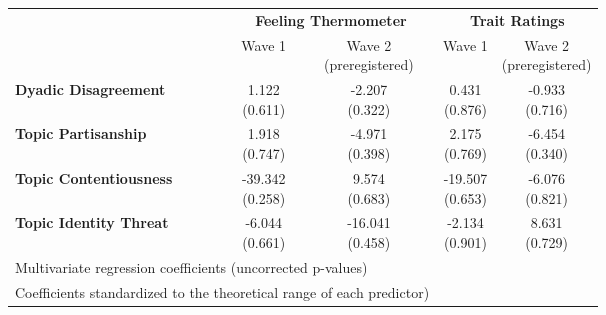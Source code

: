 \begin{tabular}{lcccc}
\hline
\multirow{2}{*}{~} & \multicolumn{2}{c}{\textbf{Feeling Thermometer}} & \multicolumn{2}{c}{\textbf{Trait Ratings}} \\
 & Wave 1 & \makecell{Wave 2 \\ (preregistered)} & Wave 1 & \makecell{Wave 2 \\ (preregistered)} \\
\hline

\textbf{Dyadic Disagreement} & \makecell{1.122 \\ (0.611)} & \makecell{-2.207 \\ (0.322)} & \makecell{0.431 \\ (0.876)} & \makecell{-0.933 \\ (0.716)} \\
\textbf{Topic Partisanship} & \makecell{1.918 \\ (0.747)} & \makecell{-4.971 \\ (0.398)} & \makecell{2.175 \\ (0.769)} & \makecell{-6.454 \\ (0.340)} \\
\textbf{Topic Contentiousness} & \makecell{-39.342 \\ (0.258)} & \makecell{9.574 \\ (0.683)} & \makecell{-19.507 \\ (0.653)} & \makecell{-6.076 \\ (0.821)} \\
\textbf{Topic Identity Threat} & \makecell{-6.044 \\ (0.661)} & \makecell{-16.041 \\ (0.458)} & \makecell{-2.134 \\ (0.901)} & \makecell{8.631 \\ (0.729)} \\
\hline

 \multicolumn{3}{l}{\footnotesize Multivariate regression coefficients (uncorrected p-values)}\\
 \multicolumn{3}{l}{\footnotesize Coefficients standardized to the theoretical range of each predictor)}\\
 \hline
\end{tabular}
